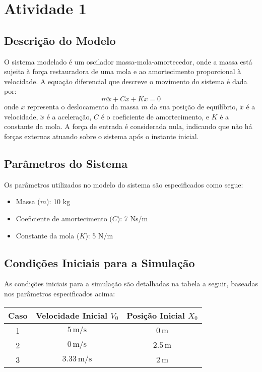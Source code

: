 \section{Atividade 1}
\subsection{Descrição do Modelo}
O sistema modelado é um oscilador massa-mola-amortecedor, onde a massa está sujeita à força restauradora de uma mola e ao amortecimento proporcional à velocidade. A equação diferencial que descreve o movimento do sistema é dada por:
\[
    m \ddot{x} + C \dot{x} + Kx = 0
\]
onde \( x \) representa o deslocamento da massa \( m \) da sua posição de equilíbrio, \( \dot{x} \) é a velocidade, \( \ddot{x} \) é a aceleração, \( C \) é o coeficiente de amortecimento, e \( K \) é a constante da mola. A força de entrada é considerada nula, indicando que não há forças externas atuando sobre o sistema após o instante inicial.

\subsection{Parâmetros do Sistema}
Os parâmetros utilizados no modelo do sistema são especificados como segue:
\begin{itemize}
    \item Massa (\( m \)): 10 kg
    \item Coeficiente de amortecimento (\( C \)): 7 Ns/m
    \item Constante da mola (\( K \)): 5 N/m
\end{itemize}

\subsection{Condições Iniciais para a Simulação}
As condições iniciais para a simulação são detalhadas na tabela a seguir, baseadas nos parâmetros especificados acima:
\begin{center}
    \begin{tabular}{|c|c|c|}
        \hline
        \textbf{Caso} & \textbf{Velocidade Inicial \( V_0 \)} & \textbf{Posição Inicial \( X_0 \)} \\
        \hline
        1             & \( 5 \, \text{m/s} \)                 & \( 0 \, \text{m} \)                \\
        2             & \( 0 \, \text{m/s} \)                 & \( 2.5 \, \text{m} \)              \\
        3             & \( 3.33 \, \text{m/s} \)              & \( 2 \, \text{m} \)                \\
        \hline
    \end{tabular}
\end{center}

